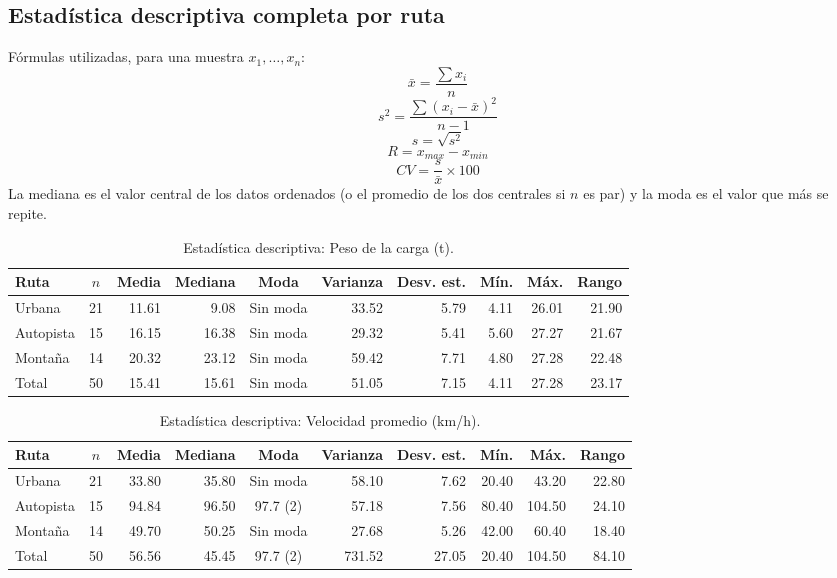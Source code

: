 \documentclass[12pt,letterpaper]{article}
\newcommand{\paren}[1]{\left(#1\right)}
\begin{document}
\subsection{Estadística descriptiva completa por ruta}

Fórmulas utilizadas, para una muestra $x_1, \dots, x_n$:
$$ \bar{x} = \frac{\sum x_i}{n} $$
$$ s^2 = \frac{\sum \paren{x_i - \bar{x}}^2}{n - 1} $$
$$ s = \sqrt{s^2} $$
$$ R = x_{max} - x_{min} $$
$$ CV = \frac{s}{\bar{x}} \times 100 $$
La mediana es el valor central de los datos ordenados (o el promedio de los dos centrales si $n$ es par) y la moda es el valor que más se repite.

\begin{table}[H]
\centering
\caption{Estadística descriptiva: Peso de la carga (t).}
\small\setlength{\tabcolsep}{4.5pt}
\begin{tabular}{lcrrcrrrrr}
\toprule
Ruta & $n$ & Media & Mediana & Moda & Varianza & Desv. est. & Mín. & Máx. & Rango \\
\midrule
Urbana & 21 & 11.61 & 9.08 & Sin moda & 33.52 & 5.79 & 4.11 & 26.01 & 21.90 \\
Autopista & 15 & 16.15 & 16.38 & Sin moda & 29.32 & 5.41 & 5.60 & 27.27 & 21.67 \\
Montaña & 14 & 20.32 & 23.12 & Sin moda & 59.42 & 7.71 & 4.80 & 27.28 & 22.48 \\
\midrule
Total & 50 & 15.41 & 15.61 & Sin moda & 51.05 & 7.15 & 4.11 & 27.28 & 23.17 \\
\bottomrule
\end{tabular}
\end{table}

\begin{table}[H]
\centering
\caption{Estadística descriptiva: Velocidad promedio (km/h).}
\small\setlength{\tabcolsep}{4.5pt}
\begin{tabular}{lcrrcrrrrr}
\toprule
Ruta & $n$ & Media & Mediana & Moda & Varianza & Desv. est. & Mín. & Máx. & Rango \\
\midrule
Urbana & 21 & 33.80 & 35.80 & Sin moda & 58.10 & 7.62 & 20.40 & 43.20 & 22.80 \\
Autopista & 15 & 94.84 & 96.50 & 97.7 (2) & 57.18 & 7.56 & 80.40 & 104.50 & 24.10 \\
Montaña & 14 & 49.70 & 50.25 & Sin moda & 27.68 & 5.26 & 42.00 & 60.40 & 18.40 \\
\midrule
Total & 50 & 56.56 & 45.45 & 97.7 (2) & 731.52 & 27.05 & 20.40 & 104.50 & 84.10 \\
\bottomrule
\end{tabular}
\end{table}
\end{document}
